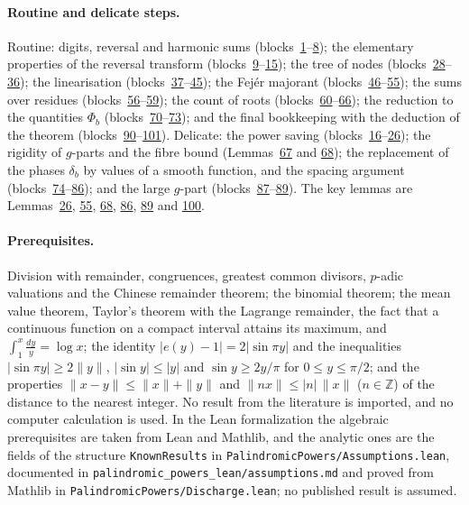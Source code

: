 \documentclass[11pt]{article}
\theoremstyle{definition}\newtheorem{hffdef}[hffc]{Definition}
\theoremstyle{plain}\newtheorem{hfflem}[hffc]{Lemma}\newtheorem{hffthm}[hffc]{Theorem}
\theoremstyle{remark}\newtheorem{hffrem}[hffc]{Remark}
\newcommand{\Z}{\mathbb{Z}}\newcommand{\R}{\mathbb{R}}\newcommand{\N}{\mathbb{N}}
\begin{document}
\paragraph{Routine and delicate steps.} Routine: digits, reversal and harmonic sums (blocks~\hyperref[D:conv]{1}--\hyperref[L:harm]{8}); the elementary properties of the reversal transform (blocks~\hyperref[D:psi]{9}--\hyperref[L:gap]{15}); the tree of nodes (blocks~\hyperref[D:pal]{28}--\hyperref[L:nonempty]{36}); the linearisation (blocks~\hyperref[D:phase]{37}--\hyperref[L:local]{45}); the Fej\'er majorant (blocks~\hyperref[L:fejer]{46}--\hyperref[L:red]{55}); the sums over residues (blocks~\hyperref[L:mult]{56}--\hyperref[L:asum]{59}); the count of roots (blocks~\hyperref[D:gpart]{60}--\hyperref[L:rootsn]{66}); the reduction to the quantities $\Phi_b$ (blocks~\hyperref[D:count]{70}--\hyperref[L:sumd]{73}); and the final bookkeeping with the deduction of the theorem (blocks~\hyperref[D:par]{90}--\hyperref[T:main]{101}). Delicate: the power saving (blocks~\hyperref[L:ident]{16}--\hyperref[L:saving]{26}); the rigidity of $g$-parts and the fibre bound (Lemmas~\hyperref[L:rigid]{67} and \hyperref[L:fibre]{68}); the replacement of the phases $\delta_b$ by values of a smooth function, and the spacing argument (blocks~\hyperref[D:curve]{74}--\hyperref[L:E]{86}); and the large $g$-part (blocks~\hyperref[L:mdiv]{87}--\hyperref[L:largeg]{89}). The key lemmas are Lemmas~\hyperref[L:saving]{26}, \hyperref[L:red]{55}, \hyperref[L:fibre]{68}, \hyperref[L:E]{86}, \hyperref[L:largeg]{89} and \hyperref[L:final]{100}.

\paragraph{Prerequisites.} Division with remainder, congruences, greatest common divisors, $p$-adic valuations and the Chinese remainder theorem; the binomial theorem; the mean value theorem, Taylor's theorem with the Lagrange remainder, the fact that a continuous function on a compact interval attains its maximum, and $\int_1^x\frac{dy}y=\log x$; the identity $|e(y)-1|=2|\sin\pi y|$ and the inequalities $|\sin\pi y|\ge2\|y\|$, $|\sin y|\le|y|$ and $\sin y\ge2y/\pi$ for $0\le y\le\pi/2$; and the properties $\|x-y\|\le\|x\|+\|y\|$ and $\|nx\|\le|n|\,\|x\|$ ($n\in\Z$) of the distance to the nearest integer. No result from the literature is imported, and no computer calculation is used. In the Lean formalization the algebraic prerequisites are taken from Lean and Mathlib, and the analytic ones are the fields of the structure \texttt{KnownResults} in \texttt{PalindromicPowers/\allowbreak Assumptions.lean}, documented in \texttt{palindromic\_powers\_lean/\allowbreak assumptions.md} and proved from Mathlib in \texttt{PalindromicPowers/\allowbreak Discharge.lean}; no published result is assumed.
\end{document}
